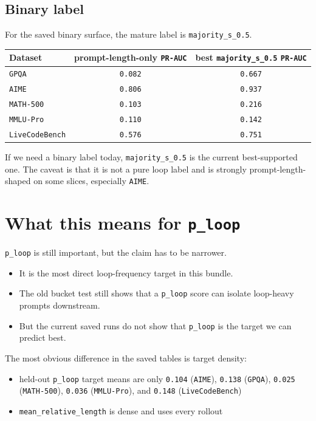 \documentclass[11pt]{article}
\begin{document}
\subsection*{Binary label}
For the saved binary surface, the mature label is \texttt{majority\_s\_0.5}.

\begin{center}
\begin{tabular}{>{\raggedright\arraybackslash}p{1.55in}cc}
\toprule
Dataset & prompt-length-only \texttt{PR-AUC} & best \texttt{majority\_s\_0.5}
\texttt{PR-AUC} \\
\midrule
\texttt{GPQA} & \texttt{0.082} & \texttt{0.667} \\
\texttt{AIME} & \texttt{0.806} & \texttt{0.937} \\
\texttt{MATH-500} & \texttt{0.103} & \texttt{0.216} \\
\texttt{MMLU-Pro} & \texttt{0.110} & \texttt{0.142} \\
\texttt{LiveCodeBench} & \texttt{0.576} & \texttt{0.751} \\
\bottomrule
\end{tabular}
\end{center}

If we need a binary label today, \texttt{majority\_s\_0.5} is the current
best-supported one. The caveat is that it is not a pure loop label and is
strongly prompt-length-shaped on some slices, especially \texttt{AIME}.

\section*{What this means for \texttt{p\_loop}}
\texttt{p\_loop} is still important, but the claim has to be narrower.
\begin{itemize}[leftmargin=1.5em]
\item It is the most direct loop-frequency target in this bundle.
\item The old bucket test still shows that a \texttt{p\_loop} score can isolate
loop-heavy prompts downstream.
\item But the current saved runs do not show that \texttt{p\_loop} is the
target we can predict best.
\end{itemize}

The most obvious difference in the saved tables is target density:
\begin{itemize}[leftmargin=1.5em]
\item held-out \texttt{p\_loop} target means are only \texttt{0.104}
(\texttt{AIME}), \texttt{0.138} (\texttt{GPQA}), \texttt{0.025}
(\texttt{MATH-500}), \texttt{0.036} (\texttt{MMLU-Pro}), and \texttt{0.148}
(\texttt{LiveCodeBench})
\item \texttt{mean\_relative\_length} is dense and uses every rollout
\end{itemize}
\end{document}

